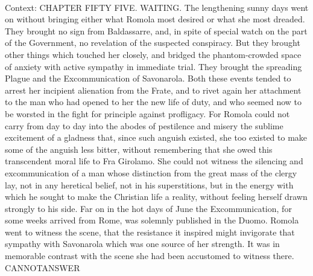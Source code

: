 \documentclass[11pt,a4paper, onecolumn]{article}
\begin{document}
\\ Context: CHAPTER FIFTY FIVE. WAITING. The lengthening sunny days went on without bringing either what Romola most desired or what she most dreaded. They brought no sign from Baldassarre, and, in spite of special watch on the part of the Government, no revelation of the suspected conspiracy. But they brought other things which touched her closely, and bridged the phantom-crowded space of anxiety with active sympathy in immediate trial. They brought the spreading Plague and the Excommunication of Savonarola. Both these events tended to arrest her incipient alienation from the Frate, and to rivet again her attachment to the man who had opened to her the new life of duty, and who seemed now to be worsted in the fight for principle against profligacy. For Romola could not carry from day to day into the abodes of pestilence and misery the sublime excitement of a gladness that, since such anguish existed, she too existed to make some of the anguish less bitter, without remembering that she owed this transcendent moral life to Fra Girolamo. She could not witness the silencing and excommunication of a man whose distinction from the great mass of the clergy lay, not in any heretical belief, not in his superstitions, but in the energy with which he sought to make the Christian life a reality, without feeling herself drawn strongly to his side. Far on in the hot days of June the Excommunication, for some weeks arrived from Rome, was solemnly published in the Duomo. Romola went to witness the scene, that the resistance it inspired might invigorate that sympathy with Savonarola which was one source of her strength. It was in memorable contrast with the scene she had been accustomed to witness there. CANNOTANSWER
\end{document}
